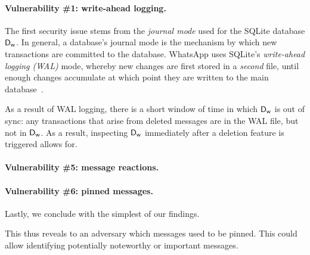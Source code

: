 \paragraph{Vulnerability \#1: write-ahead logging.} The first security issue stems from the \emph{journal mode} used for the SQLite database $\textsf{D}_{\textsf{w}}$. In general, a database's journal mode is the mechanism by which new transactions are committed to the database. WhatsApp uses SQLite's \emph{write-ahead logging (WAL)} mode, whereby new changes are first stored in a \emph{second} file, until enough changes accumulate at which point they are written to the main database~\cite{sqlite-journal-mode,sqlite-wal}.

As a result of WAL logging, there is a short window of time in which $\textsf{D}_{\textsf{w}}$ is out of sync: any transactions that arise from deleted messages are in the WAL file, but not in $\textsf{D}_{\textsf{w}}$. As a result, inspecting $\textsf{D}_{\textsf{w}}$ immediately after a deletion feature is triggered allows for. 



\paragraph{Vulnerability \#5: message reactions.}

\paragraph{Vulnerability \#6: pinned messages.} Lastly, we conclude with the simplest of our findings.

This thus reveals to an adversary which messages used to be pinned. This could allow identifying potentially noteworthy or important messages.




